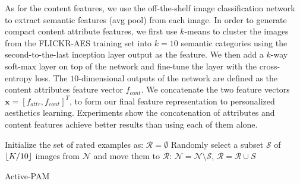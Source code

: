 As for the content features, we use the off-the-shelf image classification network\cite{ioffe2015batch} to extract semantic features (avg pool) from each image. In order to generate compact content attribute features, we first use $k$-means to cluster the images from the FLICKR-AES training set into $k=10$ semantic categories using the second-to-the-last inception layer output as the feature. We then add a $k$-way soft-max layer on top of the network and fine-tune the layer with the cross-entropy loss. The $10$-dimensional outputs of the network are defined as the content attributes feature vector $f_{cont}$. We concatenate the two feature vectors $\textbf{x} = [f_{attr}, f_{cont}]^T$, to form our final feature representation to personalized aesthetics learning. Experiments show the concatenation of attributes and content features achieve better results than using each of them alone.
\begin{algorithm}
\small
    Initialize the set of rated examples as: $\mathcal{R} = \emptyset $ \;
    Randomly select a subset $\mathcal{S}$ of $\lfloor K/10\rfloor$ images from $\mathcal{N}$ and move them to $\mathcal{R}$: $\mathcal{N} = \mathcal{N} \setminus \mathcal{S}$, $\mathcal{R} = \mathcal{R} \cup  S$ \;

    \caption{Active-PAM}
\label{alg}
\end{algorithm}
\vspace{-0.05in}

